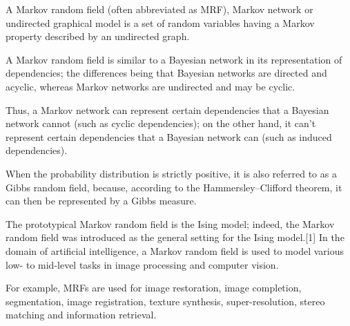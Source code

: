 A Markov random field (often abbreviated as MRF), Markov network or undirected graphical model is a 
set of random variables having a Markov property described by an undirected graph. 

A Markov random field is similar to a Bayesian network in its representation of dependencies; the differences 
being that Bayesian networks are directed and acyclic, whereas Markov networks are undirected and may be cyclic. 

Thus, a Markov network can represent certain dependencies that a Bayesian network cannot (such as cyclic dependencies); 
on the other hand, it can't represent certain dependencies that a Bayesian network can (such as induced dependencies).


When the probability distribution is strictly positive, it is also referred to as a Gibbs random field, because, 
according to the Hammersley–Clifford theorem, it can then be represented by a Gibbs measure. 

The prototypical Markov random field is the Ising model; indeed, the Markov random field was introduced as the 
general setting for the Ising model.[1] In the domain of artificial intelligence, a Markov random field is used to 
model various low- to mid-level tasks in image processing and computer vision.

For example, MRFs are used for image restoration, image completion, segmentation, image registration, 
texture synthesis, super-resolution, stereo matching and information retrieval.
